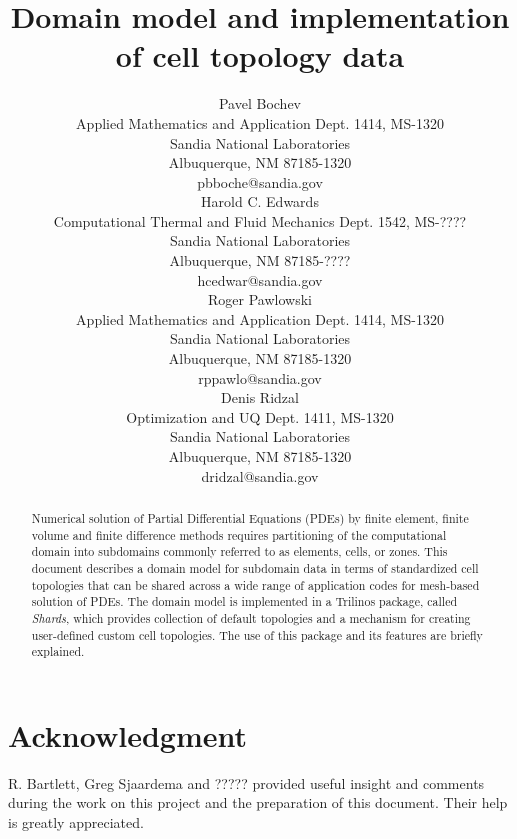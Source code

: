 \documentclass[pdf,12pt,relaxed]{SANDreport}
\title{Domain model and implementation of cell topology data}
\author{Pavel Bochev\\
    		Applied Mathematics and Application Dept. 1414, MS-1320\\
                Sandia National Laboratories\\
                Albuquerque, NM 87185-1320\\
                pbboche@sandia.gov
                \\[0.2in]
             	Harold C. Edwards \\ 
             	Computational Thermal and Fluid Mechanics Dept. 1542,  MS-???? \\
                Sandia National Laboratories\\
                Albuquerque, NM 87185-????\\
             	hcedwar@sandia.gov \\[0.2in]
		Roger Pawlowski\\
    		Applied Mathematics and Application Dept. 1414, MS-1320\\
                Sandia National Laboratories\\
                Albuquerque, NM 87185-1320\\
                rppawlo@sandia.gov
                \\[0.2in]
            	Denis Ridzal\\
		Optimization and UQ Dept. 1411, MS-1320\\
                Sandia National Laboratories\\
                Albuquerque, NM 87185-1320\\
                dridzal@sandia.gov
           }
\date{}		%
\begin{document}

    \maketitle

    \begin{abstract}
    Numerical solution of Partial Differential Equations (PDEs) by finite element, finite volume and finite difference methods requires partitioning of the computational domain into subdomains commonly referred to as elements, cells, or zones. This document describes a domain model for subdomain data in terms of standardized cell topologies that can be shared across a wide range of application codes for mesh-based solution of PDEs. 
The domain model is implemented in a Trilinos package,  called \emph{Shards},  which provides collection of default topologies and a mechanism for creating user-defined custom cell topologies. The use of this package and its features are briefly explained. 
    
    \end{abstract}


    \clearpage
    \section*{Acknowledgment}
    
    
    R. Bartlett, Greg Sjaardema and ????? provided useful insight and comments during the work on this project and the preparation of this document. Their help is greatly appreciated. 
    

    \cleardoublepage		%
    \tableofcontents
    \listoffigures
    \listoftables


    \SANDmain		%

\end{document}
